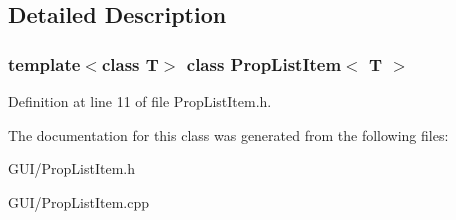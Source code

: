 \subsection{Detailed Description}
\subsubsection*{template$<$class T$>$\newline
class Prop\+List\+Item$<$ T $>$}



Definition at line 11 of file Prop\+List\+Item.\+h.



The documentation for this class was generated from the following files\+:\begin{DoxyCompactItemize}
\item 
G\+U\+I/Prop\+List\+Item.\+h\item 
G\+U\+I/Prop\+List\+Item.\+cpp\end{DoxyCompactItemize}
